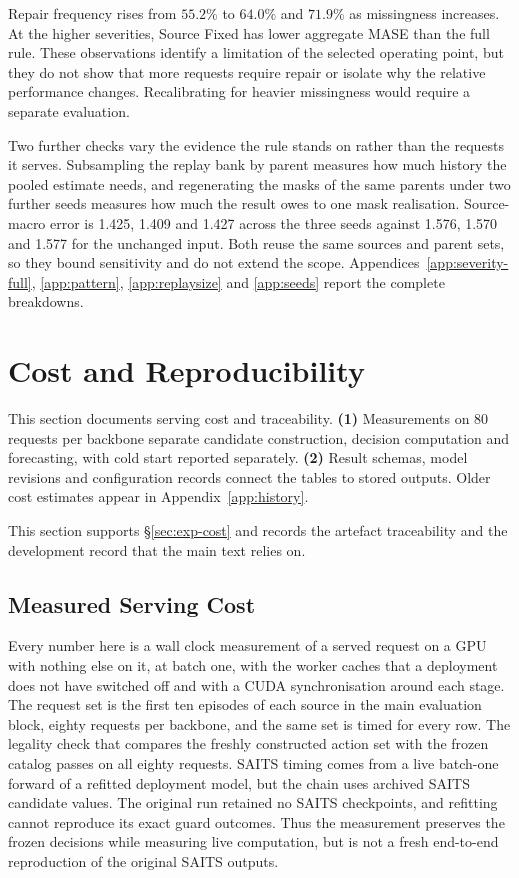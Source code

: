 \documentclass{article}
\begin{document}
Repair frequency rises from $55.2\%$ to $64.0\%$ and $71.9\%$ as missingness increases.
At the higher severities, Source Fixed has lower aggregate MASE than the full rule.
These observations identify a limitation of the selected operating point, but they do not
show that more requests require repair or isolate why the relative performance changes.
Recalibrating for heavier missingness would require a separate evaluation.

Two further checks vary the evidence the rule stands on rather than the requests it serves.
Subsampling the replay bank by parent measures how much history the pooled estimate needs, and
regenerating the masks of the same parents under two further seeds measures how much the
result owes to one mask realisation. Source-macro error is 1.425, 1.409 and 1.427 across
the three seeds against 1.576, 1.570 and 1.577 for the unchanged input.
Both reuse the same sources and parent sets, so they bound sensitivity and do not extend the
scope. Appendices~\ref{app:severity-full}, \ref{app:pattern}, \ref{app:replaysize} and
\ref{app:seeds} report the complete breakdowns.

\section{Cost and Reproducibility}

This section documents serving cost and traceability. \textbf{(1)} Measurements on 80 requests per backbone separate candidate construction, decision computation and forecasting, with cold start reported separately. \textbf{(2)} Result schemas, model revisions and configuration records connect the tables to stored outputs. Older cost estimates appear in Appendix~\ref{app:history}.

This section supports \S\ref{sec:exp-cost} and records the artefact traceability and the
development record that the main text relies on.

\subsection{Measured Serving Cost}
\label{app:calls-measured}
Every number here is a wall clock measurement of a served request on a GPU with nothing else
on it, at batch one, with the worker caches that a deployment does not have switched off and
with a CUDA synchronisation around each stage. The request set is the first ten episodes of
each source in the main evaluation block, eighty requests per backbone, and the same set is
timed for every row. The legality check that compares the freshly constructed action set with
the frozen catalog passes on all eighty requests. SAITS timing comes from a live batch-one
forward of a refitted deployment model, but the chain uses archived SAITS candidate values.
The original run retained no SAITS checkpoints, and refitting cannot reproduce its exact
guard outcomes. Thus the measurement preserves the frozen decisions while measuring live
computation, but is not a fresh end-to-end reproduction of the original SAITS outputs.
\end{document}
